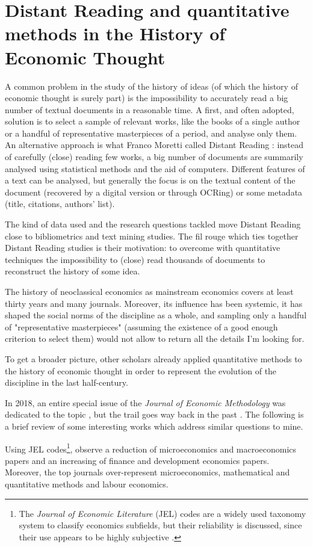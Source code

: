 \documentclass[a4paper, 11pt, headings=standardclasses, tablecaptionsbelow]{scrartcl}
\begin{document}
\section{Distant Reading and quantitative methods in the History of Economic Thought}
A common problem in the study of the history of ideas (of which the history of economic thought is surely part) is the impossibility to accurately read a big number of textual documents in a reasonable time. A first, and often adopted, solution is to select a sample of relevant works, like the books of a single author or a handful of representative masterpieces of a period, and analyse only them.
An alternative approach is what Franco Moretti called Distant Reading \parencite{moretti2013}: instead of carefully (close) reading few works, a big number of documents are summarily analysed using statistical methods and the aid of computers.
Different features of a text can be analysed, but generally the focus is on the textual content of the document (recovered by a digital version or through OCRing) or some metadata (title, citations, authors' list).

The kind of data used and the research questions tackled move Distant Reading close to bibliometrics and text mining studies. The fil rouge which ties together Distant Reading studies is their motivation: to overcome with quantitative techniques the impossibility to (close) read thousands of documents to reconstruct the history of some idea.

The history of neoclassical economics as mainstream economics covers at least thirty years and many journals. Moreover, its influence has been systemic, it has shaped the social norms of the discipline as a whole, and sampling only a handful of "representative masterpieces" (assuming the existence of a good enough criterion to select them) would not allow to return all the details I'm looking for.

To get a broader picture, other scholars already applied quantitative methods to the history of economic thought in order to represent the evolution of the discipline in the last half-century.

In 2018, an entire special issue of the \textit{Journal of Economic Methodology} was dedicated to the topic \parencite{edwards2018a,cherrier2018a}, but the trail goes way back in the past \parencite{backhouse1997}.
The following is a brief review of some interesting works which address similar questions to mine.

Using JEL codes\footnote{The \textit{Journal of Economic Literature} (JEL) codes are a widely used taxonomy system to classify economics subfields, but their reliability is discussed, since their use appears to be highly subjective \parencite{cherrier2017,kosnik2018}.}, \textcite{kelly2011} observe a reduction of microeconomics and macroeconomics papers and an increasing of finance and development economics papers.
Moreover, the top journals over-represent microeconomics, mathematical and quantitative methods and labour economics.
\end{document}
